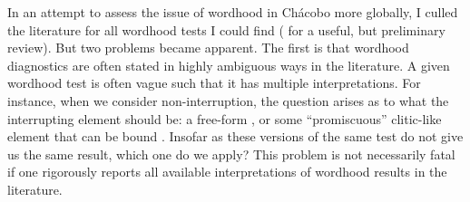 \documentclass[output=paper,hidelinks]{langscibook}
\begin{document}
In an attempt to assess the issue of wordhood in Chácobo more globally, I culled the literature for all wordhood tests I could find (\cite{haspelmathword:2011} for a useful, but preliminary review). But two problems became apparent. The first is that wordhood diagnostics are often stated in highly ambiguous ways in the literature. A given wordhood test is often vague such that it has multiple interpretations. For instance, when we consider non-interruption, the question arises as to what the interrupting element should be: a free-form \citep{haspelmathword:2011}, or some ``promiscuous'' clitic-like element that can be bound \citep{bauer2017compounds}. Insofar as these versions of the same test do not give us the same result, which one do we apply? This problem is not necessarily fatal if one rigorously reports all available interpretations of wordhood results in the literature.
\end{document}
